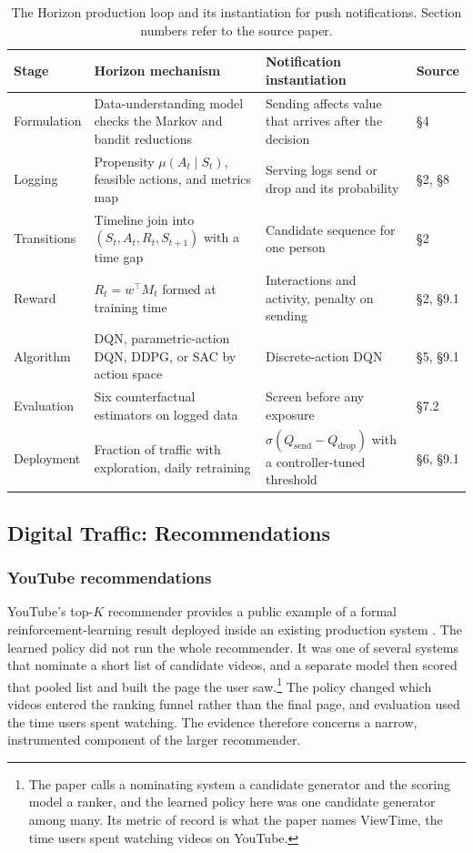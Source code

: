 \begin{table}[t]
\centering
\footnotesize
\begin{tabularx}{\textwidth}{@{}>{\raggedright\arraybackslash}p{}>{\raggedright\arraybackslash}X>{\raggedright\arraybackslash}X>{\raggedright\arraybackslash}p{}@{}}
\toprule
Stage & Horizon mechanism & Notification instantiation & Source \\
\midrule
Formulation & Data-understanding model checks the Markov and bandit reductions & Sending affects value that arrives after the decision & \S4 \\
Logging & Propensity $\mu(A_t\mid S_t)$, feasible actions, and metrics map & Serving logs send or drop and its probability & \S2, \S8 \\
Transitions & Timeline join into $(S_t,A_t,R_t,S_{t+1})$ with a time gap & Candidate sequence for one person & \S2 \\
Reward & $R_t=w^\top M_t$ formed at training time & Interactions and activity, penalty on sending & \S2, \S9.1 \\
Algorithm & DQN, parametric-action DQN, DDPG, or SAC by action space & Discrete-action DQN & \S5, \S9.1 \\
Evaluation & Six counterfactual estimators on logged data & Screen before any exposure & \S7.2 \\
Deployment & Fraction of traffic with exploration, daily retraining & $\sigma(Q_{\text{send}}-Q_{\text{drop}})$ with a controller-tuned threshold & \S6, \S9.1 \\
\bottomrule
\end{tabularx}
\caption{The Horizon production loop \citep{Gauci2019Horizon} and its instantiation for push notifications. Section numbers refer to the source paper.}
\label{tab:horizon_pipeline}
\end{table}

\subsection{Digital Traffic: Recommendations}

\subsubsection{YouTube recommendations}
\label{sec:youtube_topk}
YouTube's top-$K$ recommender provides a public example of a formal reinforcement-learning result deployed inside an existing production system \citep{Chen2019YouTubeTopK}. The learned policy did not run the whole recommender. It was one of several systems that nominate a short list of candidate videos, and a separate model then scored that pooled list and built the page the user saw.\footnote{The paper calls a nominating system a candidate generator and the scoring model a ranker, and the learned policy here was one candidate generator among many. Its metric of record is what the paper names ViewTime, the time users spent watching videos on YouTube.} The policy changed which videos entered the ranking funnel rather than the final page, and evaluation used the time users spent watching. The evidence therefore concerns a narrow, instrumented component of the larger recommender.


